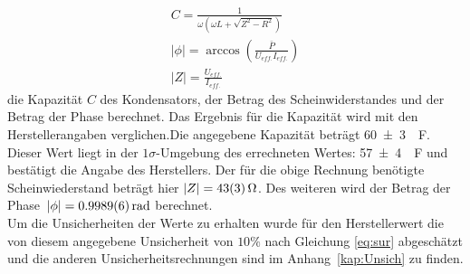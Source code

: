 \begin{align}
C=\frac{1}{\omega (\omega L+\sqrt{Z^2-R^2})}\\	
|\phi| = \arccos\left(\frac{\bar{P}}{U_{eff.}I_{eff.}}\right)\\
	|Z|=\frac{U_{eff.}}{I_{eff.}}
\end{align}
die Kapazität $C$ des Kondensators, der Betrag des Scheinwiderstandes und der Betrag der Phase berechnet. Das Ergebnis für die Kapazität wird mit den Herstellerangaben verglichen.Die angegebene Kapazität beträgt \SI{60+-3}{\mu F}.
Dieser Wert liegt in der $1\sigma$-Umgebung des errechneten Wertes: \SI{57+-4}{\mu F} und bestätigt die Angabe des Herstellers.
Der für die obige Rechnung benötigte Scheinwiederstand beträgt hier $	|Z| =\SI{43+-3}{\ohm}$. Des weiteren wird der Betrag der Phase~$|\phi| =\SI{0.9989+-0.0006}{rad}$ berechnet.\\
Um die Unsicherheiten der Werte zu erhalten wurde für den Herstellerwert die von diesem angegebene Unsicherheit von $10\%$ nach Gleichung
\ref{eq:sur} abgeschätzt und die anderen Unsicherheitsrechnungen sind im Anhang~\ref{kap:Unsich} zu finden.
